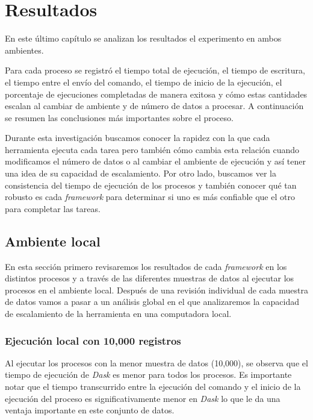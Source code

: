 \chapter{Resultados}

\noindent En este último capítulo se analizan los resultados el experimento en ambos ambientes. 

Para cada proceso se registró el tiempo total de ejecución, el tiempo de escritura, el tiempo entre el envío del comando, el tiempo de inicio de la ejecución, el porcentaje de ejecuciones completadas de manera exitosa y cómo estas cantidades escalan al cambiar de ambiente y de número de datos a procesar. A continuación se resumen las conclusiones más importantes sobre el proceso.

Durante esta investigación buscamos conocer la rapidez con la que cada herramienta ejecuta cada tarea pero también cómo cambia esta relación cuando modificamos el número de datos o al cambiar el ambiente de ejecución y así tener una idea de su capacidad de escalamiento. Por otro lado, buscamos ver la consistencia del tiempo de ejecución de los procesos y también conocer qué tan robusto es cada \textit{framework} para determinar si uno es más confiable que el otro para completar las tareas.

\newpage

\section{Ambiente local}

En esta sección primero revisaremos los resultados de cada \textit{framework} en los distintos procesos y a través de las diferentes muestras de datos al ejecutar los procesos en el ambiente local. Después de una revisión individual de cada muestra de datos vamos a pasar a un análisis global en el que analizaremos la capacidad de escalamiento de la herramienta en una computadora local.

\subsection{Ejecución local con 10,000 registros}

Al ejecutar los procesos con la menor muestra de datos (10,000), se observa que el tiempo de ejecución de \textit{Dask} es menor para todos los procesos. Es importante notar que el tiempo transcurrido entre la ejecución del comando y el inicio de la ejecución del proceso es significativamente menor en \textit{Dask} lo que le da una ventaja importante en este conjunto de datos.

